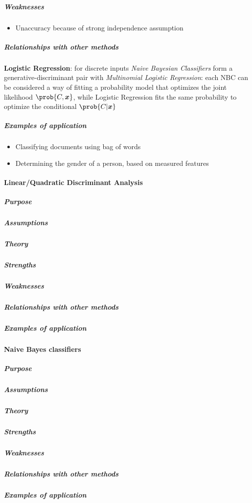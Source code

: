 \subparagraph{Weaknesses}
\begin{itemize}
    \item Unaccuracy because of strong independence assumption
\end{itemize}


\subparagraph{Relationships with other methods}
\textbf{Logistic Regression}: for discrete inputs 
\emph{Naive Bayesian Classifiers} form a 
generative-discriminant pair with \emph{Multinomial Logistic
Regression}: each NBC can be considered a way of fitting a
probability model that optimizes the joint likelihood 
$\prob{C, \bm{x}}$, while Logistic Regression fits the same 
probability to optimize the conditional $\prob{C|\bm{x}}$

\subparagraph{Examples of application}
\begin{itemize}
    \item Classifying documents using bag of words
    \item Determining the gender of a person, based on measured features 
\end{itemize}


\paragraph{Linear/Quadratic Discriminant Analysis}
\subparagraph{Purpose}
\subparagraph{Assumptions}
\subparagraph{Theory}
\subparagraph{Strengths}
\subparagraph{Weaknesses}
\subparagraph{Relationships with other methods}
\subparagraph{Examples of application}


\paragraph{Naive Bayes classifiers}
\subparagraph{Purpose}
\subparagraph{Assumptions}
\subparagraph{Theory}
\subparagraph{Strengths}
\subparagraph{Weaknesses}
\subparagraph{Relationships with other methods}
\subparagraph{Examples of application}

